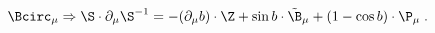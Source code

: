 \begin{equation}
\label{e5:50}
\Bcirc_{\mu} \Rightarrow \S \cdot \partial_{\mu} \S^{-1} = -(\partial_{\mu} b)\cdot \Z + \sin b \cdot \tilde{\B}_{\mu} +(1- \cos b) \cdot \P_{\mu} \; .
\end{equation}

